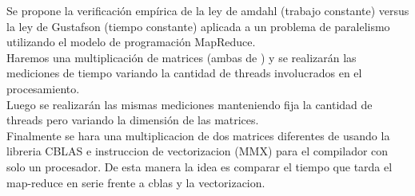 Se propone la verificación empírica de la ley de amdahl  (trabajo constante)
versus la ley de  Gustafson (tiempo constante) aplicada a un problema de
paralelismo utilizando el modelo de programación MapReduce.\\
Haremos una multiplicación de matrices (ambas de ) y se realizarán las
mediciones de tiempo variando la cantidad de threads involucrados en el
procesamiento.\\
Luego se realizarán las mismas mediciones manteniendo fija la cantidad de
threads pero variando la dimensión de las matrices.\\
Finalmente se hara una multiplicacion de dos matrices diferentes de 
usando la libreria CBLAS e instruccion de vectorizacion (MMX) para el compilador
con solo un procesador. De esta manera la idea es comparar el tiempo que tarda
el map-reduce en serie frente a cblas y la vectorizacion.

